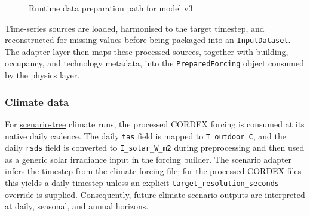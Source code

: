 \begin{figure}[ht]

  \caption{Runtime data preparation path for model v3.}
  \label{fig:data_pipeline}
\end{figure}

Time-series sources are loaded, harmonised to the target timestep, and reconstructed for missing values before being packaged into an \texttt{InputDataset}. The adapter layer then maps these processed sources, together with building, occupancy, and technology metadata, into the \texttt{PreparedForcing} object consumed by the physics layer.

\subsubsection*{Climate data}
For \hyperref[sec:scenarioTreeSystem]{scenario-tree} climate runs, the processed CORDEX forcing is consumed at its native daily cadence. The daily \texttt{tas} field is mapped to \texttt{T\_outdoor\_C}, and the daily \texttt{rsds} field is converted to \texttt{I\_solar\_W\_m2} during preprocessing and then used as a generic solar irradiance input in the forcing builder. The scenario adapter infers the timestep from the climate forcing file; for the processed CORDEX files this yields a daily timestep unless an explicit \texttt{target\_resolution\_seconds} override is supplied. Consequently, future-climate scenario outputs are interpreted at daily, seasonal, and annual horizons.

